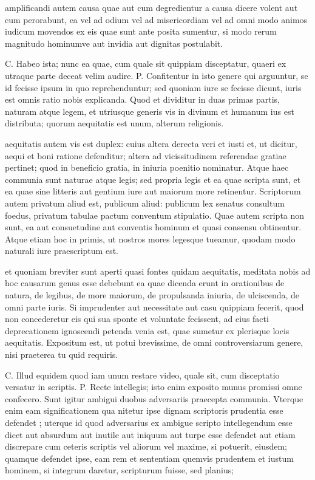  amplificandi autem causa quae aut cum degredientur a causa dicere volent aut cum perorabunt, ea vel ad odium vel ad misericordiam vel ad omni modo animos iudicum movendos ex eis quae sunt ante posita sumentur, si modo rerum magnitudo hominumve aut invidia aut dignitas postulabit.

 C. Habeo ista; nunc ea quae, cum quale sit quippiam disceptatur, quaeri ex utraque parte deceat velim audire. P. Confitentur in isto genere qui arguuntur, se id fecisse ipsum in quo reprehenduntur; sed quoniam iure se fecisse dicunt, iuris est omnis ratio nobis explicanda. Quod et dividitur in duas primas partis, naturam atque legem, et utriusque generis vis in divinum et humanum ius est distributa; quorum aequitatis est unum, alterum religionis.

 aequitatis autem vis est duplex: cuius altera derecta veri et iusti et, ut dicitur, aequi et boni ratione defenditur; altera ad vicissitudinem referendae gratiae pertinet; quod in beneficio gratia, in iniuria poenitio nominatur. Atque haec communia sunt naturae atque legis; sed propria legis et ea quae scripta sunt, et ea quae sine litteris aut gentium iure aut maiorum more retinentur. Scriptorum autem privatum aliud est, publicum aliud: publicum lex senatus consultum foedus, privatum tabulae pactum conventum stipulatio. Quae autem scripta non sunt, ea aut consuetudine aut conventis hominum et quasi consensu obtinentur. Atque etiam hoc in primis, ut nostros mores legesque tueamur, quodam modo naturali iure praescriptum est.

 et quoniam breviter sunt aperti quasi fontes quidam aequitatis, meditata nobis ad hoc causarum genus esse debebunt ea quae dicenda erunt in orationibus de natura, de legibus, de more maiorum, de propulsanda iniuria, de ulciscenda, de omni parte iuris. Si imprudenter aut necessitate aut casu quippiam fecerit, quod non concederetur eis qui sua sponte et voluntate fecissent, ad eius facti deprecationem ignoscendi petenda venia est, quae sumetur ex plerisque locis aequitatis. Expositum est, ut potui brevissime, de omni controversiarum genere, nisi praeterea tu quid requiris.

 C. Illud equidem quod iam unum restare video, quale sit, cum disceptatio versatur in scriptis. P. Recte intellegis; isto enim exposito munus promissi omne confecero. Sunt igitur ambigui duobus adversariis praecepta communia. Vterque enim eam significationem qua nitetur ipse dignam scriptoris prudentia esse defendet ; uterque id quod adversarius ex ambigue scripto intellegendum esse dicet aut absurdum aut inutile aut iniquum aut turpe esse defendet aut etiam discrepare cum ceteris scriptis vel aliorum vel maxime, si potuerit, eiusdem; quamque defendet ipse, eam rem et sententiam quemvis prudentem et iustum hominem, si integrum daretur, scripturum fuisse, sed planius;

